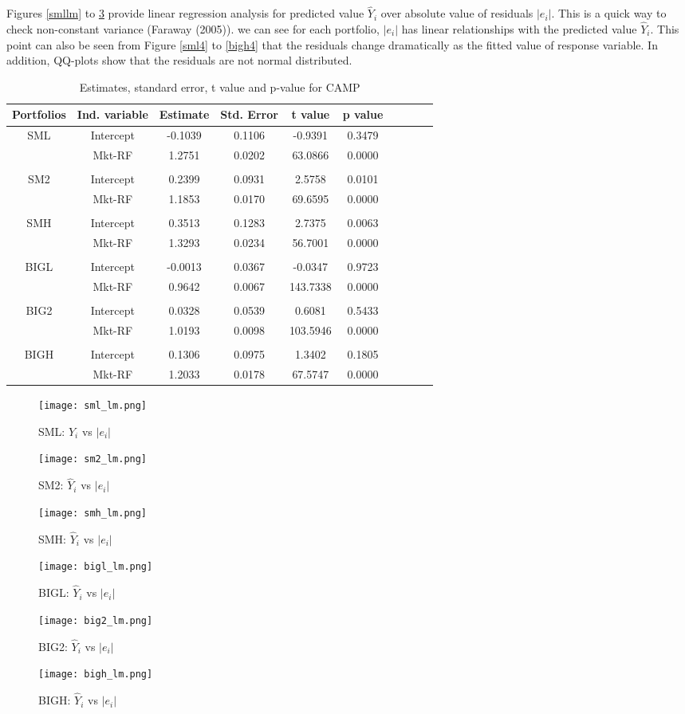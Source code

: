 \documentclass[11pt]{article}
\begin{document}
Figures \ref{smllm} to \ref{bighlm} provide linear regression analysis for predicted value $\hat{Y}_i$ over absolute value of residuals $|e_i|$. This is a quick way to check non-constant variance (Faraway (2005)).  we can see for each portfolio, $|e_i|$ has linear relationships with the predicted value $\hat{Y}_i$. This point can also be seen from Figure \ref{sml4} to \ref{bigh4} that the residuals change dramatically as the fitted value of response variable. In addition, QQ-plots show that the residuals are not normal distributed. 
\begin{table}[ht]
\centering
\begin{tabular}{cccccccccc}
  \hline
 Portfolios&Ind. variable& Estimate & Std. Error & t value & p value \\ 
  \hline
SML&Intercept & -0.1039 & 0.1106 & -0.9391 & 0.3479 \\ 
   &Mkt-RF& 1.2751 & 0.0202 & 63.0866 & 0.0000 \\ 
\\
  SM2&Intercept & 0.2399 & 0.0931 & 2.5758 & 0.0101 \\ 
   &Mkt-RF& 1.1853 & 0.0170 & 69.6595 & 0.0000 \\
\\ 
  SMH&Intercept & 0.3513 & 0.1283 & 2.7375 & 0.0063 \\ 
   &Mkt-RF& 1.3293 & 0.0234 & 56.7001 & 0.0000 \\ 
\\
 BIGL& Intercept & -0.0013 & 0.0367 & -0.0347 & 0.9723 \\ 
  &Mkt-RF & 0.9642 & 0.0067 & 143.7338 & 0.0000 \\ 
\\
  BIG2&Intercept & 0.0328 & 0.0539 & 0.6081 & 0.5433 \\ 
   &Mkt-RF& 1.0193 & 0.0098 & 103.5946 & 0.0000 \\ 
\\
  BIGH&Intercept & 0.1306 & 0.0975 & 1.3402 & 0.1805 \\ 
  & Mkt-RF& 1.2033 & 0.0178 & 67.5747 & 0.0000 \\ 
   \hline
\end{tabular}

\caption{ Estimates, standard error, t value and p-value for CAMP}\label{tab1}
\end{table}

\begin{figure}
\centering
\texttt{[image: sml\_lm.png]}
\caption{SML: $\hat{Y}_i$ vs $|e_i|$}
\label{smllm}
\texttt{[image: sm2\_lm.png]}
\caption{SM2: $\hat{Y}_i$ vs $|e_i|$}
\label{sm2lm}
\end{figure}
\begin{figure}
\centering
\texttt{[image: smh\_lm.png]}
\caption{SMH: $\hat{Y}_i$ vs $|e_i|$}
\label{smhlm}
\texttt{[image: bigl\_lm.png]}
\caption{BIGL: $\hat{Y}_i$ vs $|e_i|$}
\label{bigllm}
\end{figure}
\begin{figure}
\centering
\texttt{[image: big2\_lm.png]}
\caption{BIG2: $\hat{Y}_i$ vs $|e_i|$}
\label{big2lm}
\texttt{[image: bigh\_lm.png]}
\caption{BIGH: $\hat{Y}_i$ vs $|e_i|$}
\label{bighlm}
\end{figure}
\end{document}
